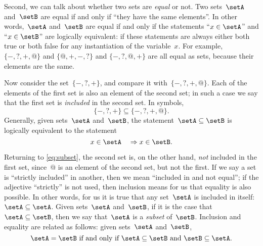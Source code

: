 Second, we can talk about whether two sets are \emph{equal} or not.
Two sets~$\setA$ and~$\setB$ are equal if and only if ``they have the same elements''.
In other words,~$\setA$ and~$\setB$ are equal if and only if the statements
``$x \in \setA$'' and  ``$x \in \setB$'' are logically equivalent: if these statements are always either both true or both false for any instantiation of the variable~$x$.
For example, $\{ -, ?, +, @ \}$ and $\{ @, +, -, ?\}$ and $\{ -, ?, @, + \}$ are all equal as sets, because their elements are the same.

Now consider the set~$\{ -, ?, + \}$, and compare it with~$\{ -, ?, +, @ \}$.
Each of the elements of the first set is also an element of the second set; in such a case we say that the first set is \emph{included} in the second set. In symbols,
\begin{equation}
  \label{eq:subset}
\{ -, ?, + \} \subseteq \{ -, ?, +, @ \}.
\end{equation}
Generally, given sets~$\setA$ and~$\setB$, the statement~$\setA \subseteq \setB$ is logically equivalent to the statement
\begin{equation*}
x \in \setA \quad \Rightarrow  x \in \setB.
\end{equation*}

Returning to \cref{eq:subset}, the second set is, on the other hand, \emph{not} included in the first set, since~$@$ is an element of the second set, but not the first.
If we say a set is ``strictly included'' in another, then we mean ``included in and not equal'';
if the adjective ``strictly'' is not used, then inclusion means for us that equality is also possible.
In other words, for us it is true that any set~$\setA$ is included in itself:~$\setA \subseteq \setA$.
Given sets~$\setA$ and~$\setB$, if it is the case that~$\setA \subseteq \setB$, then we say that~$\setA$ is a \emph{subset} of~$\setB$.
Inclusion and equality are related as follows: given sets~$\setA$ and~$\setB$,
\begin{equation*}
\setA = \setB \text{ if and only if } \setA \subseteq \setB \text{ and } \setB \subseteq \setA.
\end{equation*}

